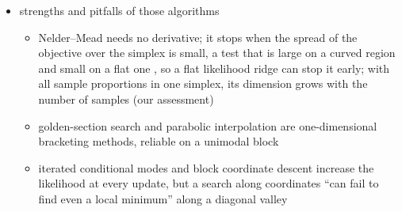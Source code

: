 \begin{itemize}
\begin{itemize}
          1\%; a per-gene search then splits each bulk into its two components, and the two steps alternate
          \cite[p.~1866 and Supplementary Sect.~1.1]{ahnDeMixDeconvolutionMixed2013}
    \item \emph{DeMixT} keeps the numerical integration, a single or a double integral for two or three components, and
          replaces the joint search by iterated conditional modes: sample-wise proportions and gene-wise parameters are
          maximised in turn, each block in parallel, by golden-section search with successive parabolic interpolation
          under box bounds \cite[p.~453 and Transparent Methods]{wangTranscriptomeDeconvolutionHeterogeneous2018}
    \item \emph{DeMixNB} writes the convolution of two negative-binomial components exactly as a finite sum, and
          alternates the same blocks with L-BFGS-B, the proportions bounded to \([0.05,0.95]\), from three random starts
          \cite{montierthDeconvolutionSparsecountRNA2025}
    \item \emph{ISOpureR} maximises a multinomial--Dirichlet posterior by block coordinate descent; each block is fitted by
          Rasmussen's nonlinear conjugate gradient, with the Polak--Ribi\`ere direction and a Wolfe--Powell line search
          (\texttt{cg\_code} in the package source) \cite[pp.~6--7]{anghelISOpureRImplementationComputational2015}
  \end{itemize}
  \item strengths and pitfalls of those algorithms
  \begin{itemize}
    \item Nelder--Mead needs no derivative; it stops when the spread of the objective over the simplex is small, a test
          that is large on a curved region and small on a flat one \cite[Sect.~7.5, pp.~119--124]{kochenderferAlgorithmsOptimization2026}, so a flat
          likelihood ridge can stop it early; with all sample proportions in one simplex, its dimension grows with the
          number of samples (our assessment)
    \item golden-section search and parabolic interpolation are one-dimensional bracketing methods, reliable on a
          unimodal block \cite[Sects.~3.4--3.5, pp.~47--53]{kochenderferAlgorithmsOptimization2026}
    \item iterated conditional modes and block coordinate descent increase the likelihood at every update, but a search
          along coordinates ``can fail to find even a local minimum'' along a diagonal valley

\end{itemize}
\end{itemize}
